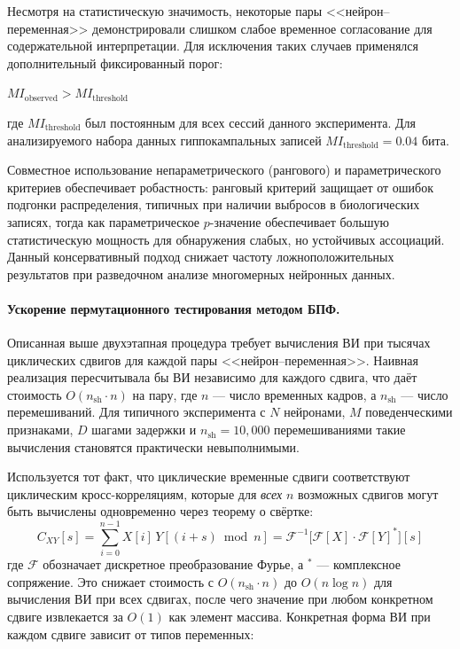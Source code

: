 Несмотря на статистическую значимость, некоторые пары <<нейрон--переменная>> демонстрировали слишком слабое временное согласование для содержательной интерпретации. Для исключения таких случаев применялся дополнительный фиксированный порог:

$MI_{\text{observed}} > MI_{\text{threshold}}$

где $MI_{\text{threshold}}$ был постоянным для всех сессий данного эксперимента. Для анализируемого набора данных гиппокампальных записей
$MI_{\text{threshold}} = 0.04$ бита.

Совместное использование непараметрического (рангового) и параметрического критериев обеспечивает робастность: ранговый критерий защищает от ошибок подгонки распределения, типичных при наличии выбросов в биологических записях, тогда как параметрическое $p$-значение обеспечивает большую статистическую мощность для обнаружения слабых, но устойчивых ассоциаций.
Данный консервативный подход снижает частоту ложноположительных результатов при разведочном анализе многомерных нейронных данных.

\paragraph{Ускорение пермутационного тестирования методом БПФ.}

Описанная выше двухэтапная процедура требует вычисления ВИ при тысячах циклических сдвигов для каждой пары <<нейрон--переменная>>. Наивная реализация пересчитывала бы ВИ независимо для каждого сдвига, что даёт стоимость $O(n_{\text{sh}}
\cdot n)$ на пару, где $n$ --- число временных кадров, а $n_{\text{sh}}$ --- число перемешиваний. Для типичного эксперимента с $N$ нейронами, $M$ поведенческими признаками,
$D$ шагами задержки и $n_{\text{sh}} = 10{,}000$ перемешиваниями такие вычисления становятся
практически невыполнимыми.

Используется тот факт, что циклические временные сдвиги соответствуют циклическим кросс-корреляциям, которые для \emph{всех} $n$ возможных сдвигов
могут быть вычислены одновременно через теорему о свёртке:
%
\begin{equation}
\label{eq:fft_xcorr}
C_{XY}[s] = \sum_{i=0}^{n-1} X[i] \, Y[(i+s) \bmod n]
           = \mathcal{F}^{-1}\!\bigl[\mathcal{F}[X] \cdot \mathcal{F}[Y]^{*}\bigr][s]
\end{equation}
%
где $\mathcal{F}$ обозначает дискретное преобразование Фурье, а $^{*}$ --- комплексное сопряжение. Это снижает стоимость с $O(n_{\text{sh}} \cdot n)$ до
$O(n \log n)$ для вычисления ВИ при всех сдвигах, после чего значение при любом конкретном сдвиге извлекается за $O(1)$ как элемент массива. Конкретная форма ВИ при каждом сдвиге зависит от типов переменных:

